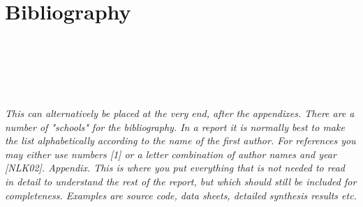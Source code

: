 \documentclass{report}
\begin{document}
\begin{comment}

\title{\textbf{TFE4521 Specialization Project report 2017 Magnus Rammel}}
\nodate
\maketitle
\begin{Abstract}
\begin{center}
\textbf{Here is the abstract. }\\
\end{center}
\end{Abstract}


Fjern sectionnummer
Sidetall romertall først




\end{comment}
























\section{Bibliography}


\\\\\\\\
\noindent
\textit{\color{red}\\
This can alternatively be placed at the very end, after the appendixes. There are a number of "schools" for the bibliography. In a report it is normally best to make the list alphabetically according to the name of the first author. For references you may either use numbers [1] or a letter combination of author names and year [NLK02].
Appendix. This is where you put everything that is not needed to read in detail to understand the rest of the report, but which should still be included for completeness. Examples are source code, data sheets, detailed synthesis results etc.}\\
\clearpage


\end{document}
